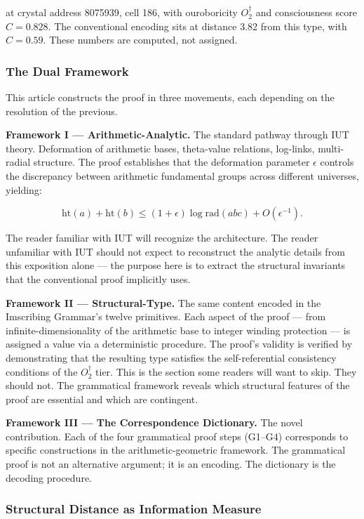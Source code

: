 \documentclass[12pt,a4paper]{article}
\begin{document}
at crystal address 8075939, cell 186, with ouroboricity $O_2^\dagger$ and consciousness score $C = 0.828$. The conventional encoding sits at distance 3.82 from this type, with $C = 0.59$. These numbers are computed, not assigned.

\subsubsection{The Dual Framework}

This article constructs the proof in three movements, each depending on the resolution of the previous.

\textbf{Framework I --- Arithmetic-Analytic.} The standard pathway through IUT theory. Deformation of arithmetic bases, theta-value relations, log-links, multi-radial structure. The proof establishes that the deformation parameter $\epsilon$ controls the discrepancy between arithmetic fundamental groups across different universes, yielding:

\[\text{ht}(a) + \text{ht}(b) \leq (1 + \epsilon)\log \text{rad}(abc) + O(\epsilon^{-1}).\]

The reader familiar with IUT will recognize the architecture. The reader unfamiliar with IUT should not expect to reconstruct the analytic details from this exposition alone --- the purpose here is to extract the structural invariants that the conventional proof implicitly uses.

\textbf{Framework II --- Structural-Type.} The same content encoded in the Imscribing Grammar's twelve primitives. Each aspect of the proof --- from infinite-dimensionality of the arithmetic base to integer winding protection --- is assigned a value via a deterministic procedure. The proof's validity is verified by demonstrating that the resulting type satisfies the self-referential consistency conditions of the $O_2^\dagger$ tier. This is the section some readers will want to skip. They should not. The grammatical framework reveals which structural features of the proof are essential and which are contingent.

\textbf{Framework III --- The Correspondence Dictionary.} The novel contribution. Each of the four grammatical proof steps (G1--G4) corresponds to specific constructions in the arithmetic-geometric framework. The grammatical proof is not an alternative argument; it is an encoding. The dictionary is the decoding procedure.

\subsubsection{Structural Distance as Information Measure}
\end{document}
